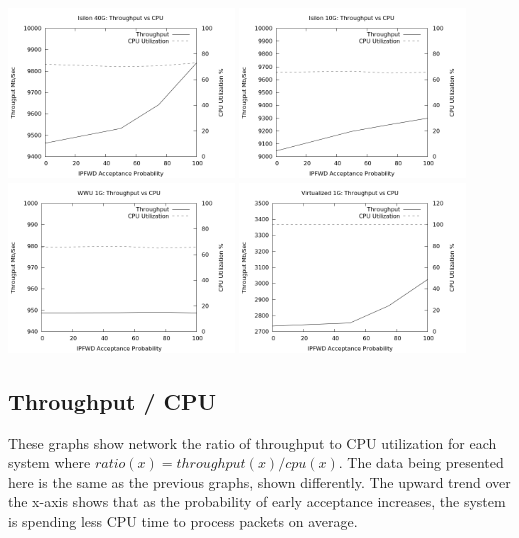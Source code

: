 \documentclass[journal]{IEEEtran}
\begin{document}
    \begin{center}
      \includegraphics[width=0.45\textwidth]{cpu_isilon40}
      \includegraphics[width=0.45\textwidth]{cpu_isilon10}
      \includegraphics[width=0.45\textwidth]{cpu_wwu1}
      \includegraphics[width=0.45\textwidth]{cpu_virtual10}
    \end{center}

  \subsection{Throughput / CPU}

    These graphs show network the ratio of throughput to CPU utilization for
    each system where $ratio(x) = throughput(x) / cpu(x)$. The data being
    presented here is the same as the previous graphs, shown differently. The
    upward trend over the x-axis shows that as the probability of early
    acceptance increases, the system is spending less CPU time to process
    packets on average.
\end{document}
